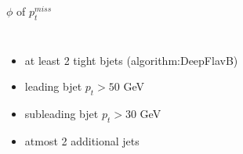 \documentclass[10pt,xcolor=dvipsnames]{beamer}
\begin{document}
\begin{frame}[fragile]{$\phi $ of $p^{miss}_t$ }
\begin{columns}
\begin{itemize}
      \item {at least 2 tight bjets (algorithm:DeepFlavB)}
      \item {leading bjet $p_t > 50 $ GeV}
      \item {subleading bjet $p_t > 30 $ GeV}
      \item {atmost 2 additional jets}
    \end{itemize}
  \end{columns}
\end{frame}






\end{document}
